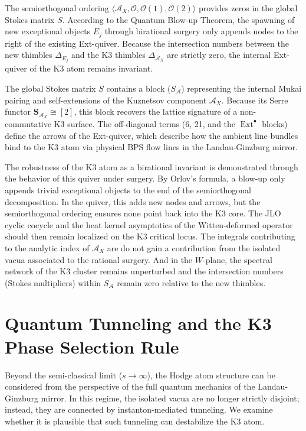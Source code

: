 \documentclass[12pt,reqno]{amsart}
\theoremstyle{remark} \newtheorem{remark}[theorem]{Remark}
\begin{document}
The semiorthogonal ordering $\langle \mathcal{A}_X, \mathcal{O},
\mathcal{O}(1), \mathcal{O}(2) \rangle$ provides zeros
in the global Stokes matrix $S$.
According to the Quantum Blow-up Theorem, the
spawning of new exceptional objects $E_j$ through birational surgery
only appends nodes to the right of the existing Ext-quiver. Because
the intersection numbers between the new thimbles $\Delta_{E_j}$ and
the K3 thimbles $\Delta_{\mathcal{A}_X}$ are strictly zero, the
internal Ext-quiver of the K3 atom remains invariant.

The global Stokes matrix $S$ contains a block
($S_{\mathcal{A}}$) representing the internal Mukai pairing and
self-extensions of the Kuznetsov component $\mathcal{A}_X$. Because
its Serre functor $\mathbf{S}_{\mathcal{A}_X} \cong [2]$, this block recovers
the lattice signature of a non-commutative K3 surface.  The
off-diagonal terms (6, 21, and the $\operatorname{Ext}^\bullet$
blocks) define the arrows of the Ext-quiver, which describe how
the ambient line bundles bind to the K3 atom via physical BPS flow
lines in the Landau-Ginzburg mirror.

The robustness of the K3 atom as a birational invariant is
demonstrated through the behavior of this quiver under surgery.  By
Orlov’s formula, a blow-up only appends trivial exceptional objects to
the end of the semiorthogonal decomposition. In the quiver, this adds
new nodes and arrows, but the semiorthogonal ordering ensures none
point back into the K3 core.
The JLO cyclic cocycle and the heat kernel asymptotics of the
Witten-deformed operator should then remain localized on the K3 critical
locus. The integrals contributing to the analytic index of
$\mathcal{A}_X$ are do not gain a contribution from the isolated vacua
associated to the rational surgery.
And in the $W$-plane, the spectral network of the
K3 cluster remains unperturbed and the intersection numbers (Stokes
multipliers) within $S_{\mathcal{A}}$ remain zero relative to
the new thimbles.

\section{Quantum Tunneling and the K3 Phase Selection Rule}

Beyond the semi-classical limit ($s \to \infty$), the Hodge atom
structure can be considered from the perspective of
the full quantum mechanics of the
Landau-Ginzburg mirror. In this regime, the isolated vacua are no
longer strictly disjoint; instead, they are connected by
instanton-mediated tunneling. We examine whether it is plausible that
such tunneling can destabilize the K3 atom.
\end{document}
